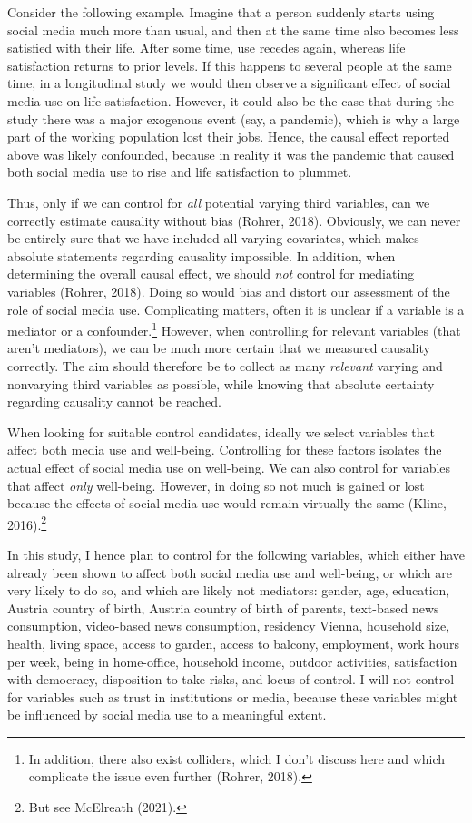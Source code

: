 \documentclass[
  english,
  man,mask,floatsintext]{apa6}
\begin{document}
Consider the following example.
Imagine that a person suddenly starts using social media much more than usual, and then at the same time also becomes less satisfied with their life.
After some time, use recedes again, whereas life satisfaction returns to prior levels.
If this happens to several people at the same time, in a longitudinal study we would then observe a significant effect of social media use on life satisfaction.
However, it could also be the case that during the study there was a major exogenous event (say, a pandemic), which is why a large part of the working population lost their jobs.
Hence, the causal effect reported above was likely confounded, because in reality it was the pandemic that caused both social media use to rise and life satisfaction to plummet.

Thus, only if we can control for \emph{all} potential varying third variables, can we correctly estimate causality without bias (Rohrer, 2018).
Obviously, we can never be entirely sure that we have included all varying covariates, which makes absolute statements regarding causality impossible.
In addition, when determining the overall causal effect, we should \emph{not} control for mediating variables (Rohrer, 2018).
Doing so would bias and distort our assessment of the role of social media use.
Complicating matters, often it is unclear if a variable is a mediator or a confounder.\footnote{In addition, there also exist colliders, which I don't discuss here and which complicate the issue even further (Rohrer, 2018).}
However, when controlling for relevant variables (that aren't mediators), we can be much more certain that we measured causality correctly.
The aim should therefore be to collect as many \emph{relevant} varying and nonvarying third variables as possible, while knowing that absolute certainty regarding causality cannot be reached.

When looking for suitable control candidates, ideally we select variables that affect both media use and well-being.
Controlling for these factors isolates the actual effect of social media use on well-being.
We can also control for variables that affect \emph{only} well-being.
However, in doing so not much is gained or lost because the effects of social media use would remain virtually the same (Kline, 2016).\footnote{But see McElreath (2021).}

In this study, I hence plan to control for the following variables, which either have already been shown to affect both social media use and well-being, or which are very likely to do so, and which are likely not mediators:
gender, age, education, Austria country of birth, Austria country of birth of parents, text-based news consumption, video-based news consumption, residency Vienna, household size, health, living space, access to garden, access to balcony, employment, work hours per week, being in home-office, household income, outdoor activities, satisfaction with democracy, disposition to take risks, and locus of control.
I will not control for variables such as trust in institutions or media, because these variables might be influenced by social media use to a meaningful extent.
\end{document}
